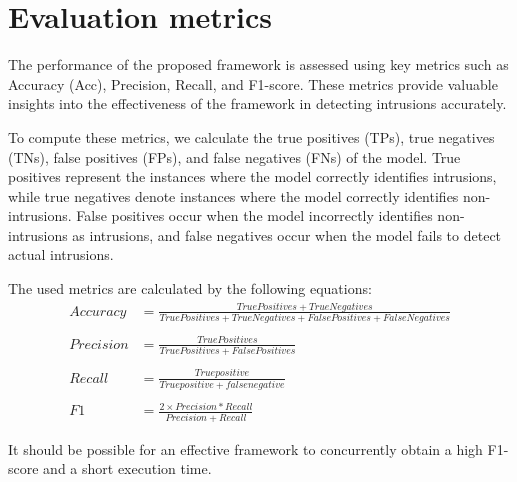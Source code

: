 \section{Evaluation metrics}
The performance of the proposed framework is assessed using key metrics such as Accuracy (Acc), Precision, Recall, and F1-score. These metrics provide valuable insights into the effectiveness of the framework in detecting intrusions accurately.

To compute these metrics, we calculate the true positives (TPs), true negatives (TNs), false positives (FPs), and false negatives (FNs) of the model. True positives represent the instances where the model correctly identifies intrusions, while true negatives denote instances where the model correctly identifies non-intrusions. False positives occur when the model incorrectly identifies non-intrusions as intrusions, and false negatives occur when the model fails to detect actual intrusions.

The used metrics are calculated by the
following equations:
\begin{align*}
Accuracy &= \frac{True Positives + True Negatives}{True Positives + True Negatives + False Positives + False Negatives}\\\\
Precision &= \frac{True Positives}{True Positives + False Positives}\\\\
Recall &= \frac{True positive}{True positive + false negative}\\\\
F1 &= \frac{2 \times Precision * Recall}{Precision + Recall}
\end{align*}

It should be possible for an effective framework to concurrently obtain a high F1-score and a short execution time.




